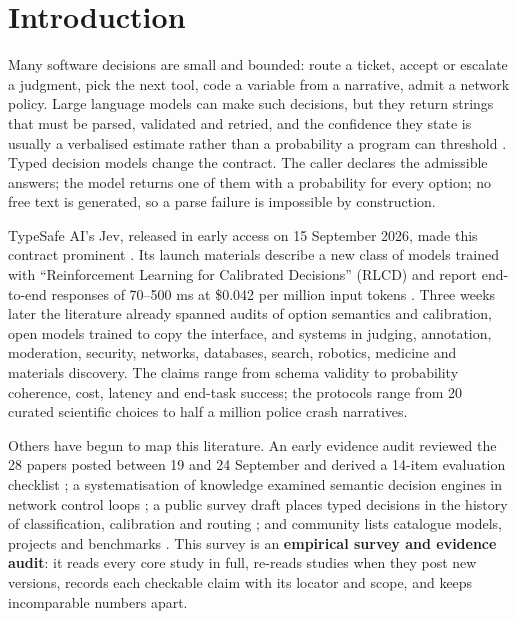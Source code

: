 \section{Introduction}\label{sec:introduction}

Many software decisions are small and bounded: route a ticket, accept or escalate a judgment, pick the next tool, code a variable from a narrative, admit a network policy. Large language models can make such decisions, but they return strings that must be parsed, validated and retried, and the confidence they state is usually a verbalised estimate rather than a probability a program can threshold \citep{arxiv2207_05221,arxiv2503_15850}. Typed decision models change the contract. The caller declares the admissible answers; the model returns one of them with a probability for every option; no free text is generated, so a parse failure is impossible by construction.

TypeSafe AI's Jev, released in early access on 15 September 2026, made this contract prominent \citep{typesafe2026launch}. Its launch materials describe a new class of models trained with “Reinforcement Learning for Calibrated Decisions” (RLCD) and report end-to-end responses of 70–500 ms at \$0.042 per million input tokens \citep{typesafe2026launch,typesafe2026models}. Three weeks later the literature already spanned audits of option semantics and calibration, open models trained to copy the interface, and systems in judging, annotation, moderation, security, networks, databases, search, robotics, medicine and materials discovery. The claims range from schema validity to probability coherence, cost, latency and end-task success; the protocols range from 20 curated scientific choices to half a million police crash narratives.

Others have begun to map this literature. An early evidence audit reviewed the 28 papers posted between 19 and 24 September and derived a 14-item evaluation checklist \citep{arxiv2609_32160}; a systematisation of knowledge examined semantic decision engines in network control loops \citep{arxiv2610_06425}; a public survey draft places typed decisions in the history of classification, calibration and routing \citep{decisionsnottokens2026}; and community lists catalogue models, projects and benchmarks \citep{gh_omnijev_awesome_jev_gallery,gh_omnijev_awesome_jev_papers}. This survey is an \textbf{empirical survey and evidence audit}: it reads every core study in full, re-reads studies when they post new versions, records each checkable claim with its locator and scope, and keeps incomparable numbers apart.


